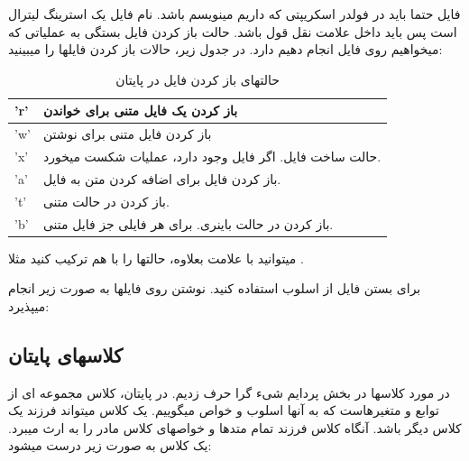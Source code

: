 \documentclass[14pt,a4paper]{memoir}
\begin{document}
 فایل حتما باید در فولدر اسکریپتی که داریم مینویسم باشد. نام فایل یک استرینگ لیترال است پس باید داخل علامت نقل قول باشد. حالت باز کردن فایل بستگی به عملیاتی که میخواهیم روی فایل انجام دهیم دارد. در جدول زیر، حالات باز کردن فایلها را میبینید:
 
\begin{table}[H]
	\begin{tabular}{|l|l|}
		\hline
		'r' & باز کردن یک فایل متنی برای خواندن                       \\ \hline
		'w' & باز کردن فایل متنی برای نوشتن                           \\ \hline
		'x' & حالت ساخت فایل. اگر فایل وجود دارد، عملیات شکست میخورد. \\ \hline
		'a' & باز کردن فایل برای اضافه کردن متن به فایل.              \\ \hline
		't' & باز کردن در حالت متنی.                                  \\ \hline
		'b' & باز کردن در حالت باینری. برای هر فایلی جز فایل متنی.    \\ \hline
	\end{tabular}
\caption{حالتهای باز کردن فایل در پایتان}
\end{table}
	 
	 میتوانید با علامت بعلاوه، حالتها را با هم ترکیب کنید مثلا .
	 
	 برای بستن فایل از اسلوب  استفاده کنید. نوشتن روی فایلها به صورت زیر انجام میپذیرد:
	 
	 	 	 \begin{latin}
	 	
	 \end{latin}
	 
	 \subsection{کلاسهای پایتان}\label{pythonclass}
	 
	 در مورد کلاسها در بخش پردایم شیء گرا حرف زدیم. در پایتان، کلاس مجموعه ای از توابع و متغیرهاست که به آنها اسلوب و خواص میگوییم. یک کلاس میتواند فرزند یک کلاس دیگر باشد. آنگاه کلاس فرزند تمام متدها و خواصهای کلاس مادر را به ارث میبرد. یک کلاس به صورت زیر درست میشود:
	 
\end{document}
